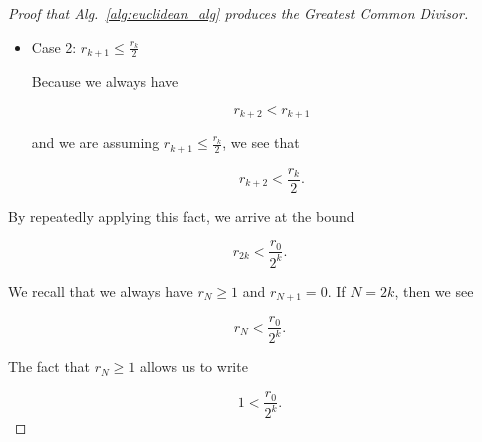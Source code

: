 \begin{proof}[Proof that Alg.~\ref{alg:euclidean_alg} produces the
    Greatest Common Divisor]
\begin{itemize}
\begin{equation}
    0 \le r_{k} - r_{k+1} < \frac{r_{k}}{2}.
\end{equation}

\noindent
This equation combined with $r_{k+1} > \frac{r_{k}}{2}$
shows us that we have

\begin{equation}
    0 \le r_{k} - r_{k+1} < r_{k+1}.
\end{equation}

\noindent
This means that $q_{k+1} = 1$.
Thus, we have

\begin{align}
    r_{k} &= r_{k+1} + \parens{r_{k}-r_{k+1}} \nonumber\\
        &= r_{k+1} + r_{k+2}
\end{align}

\noindent
with

\begin{equation}
    r_{k+2} < \frac{r_{k}}{2}.
\end{equation}

\item Case 2: $r_{k+1} \le \frac{r_{k}}{2}$

Because we always have

\begin{equation}
    r_{k+2} < r_{k+1}
\end{equation}

\noindent
and we are assuming $r_{k+1} \le \frac{r_{k}}{2}$,
we see that

\begin{equation}
    r_{k+2} < \frac{r_{k}}{2}.
\end{equation}
\end{itemize}

By repeatedly applying this fact, we arrive at the bound

\begin{equation}
    r_{2k} < \frac{r_{0}}{2^{k}}.
\end{equation}

\noindent
We recall that we always have $r_{N}\ge 1$ and $r_{N+1}=0$.
If $N = 2k$, then we see

\begin{equation}
    r_{N} < \frac{r_{0}}{2^{k}}.
\end{equation}

\noindent
The fact that $r_{N}\ge 1$ allows us to write

\begin{equation}
    1 < \frac{r_{0}}{2^{k}}.
\end{equation}


\end{proof}
